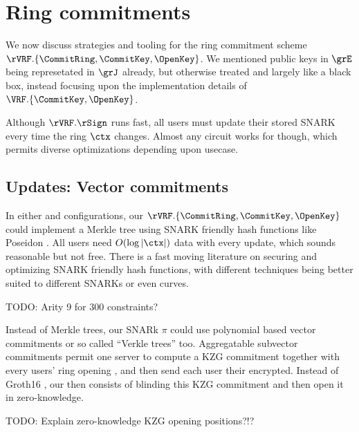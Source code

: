 \section{Ring commitments}

We now discuss strategies and tooling for the ring commitment scheme
$\rVRF.\{ \CommitRing, \CommitKey, \OpenKey \}$.
We mentioned public keys in $\grE$ being represetated in $\grJ$ already,
but otherwise treated \pifast and \pisafe largely like a black box,
instead focusing upon the implementation details of 
 $\VRF.\{ \CommitKey, \OpenKey \}$.


Although $\rVRF.\rSign$ runs fast, all users must update their stored
SNARK \pifast every time the ring $\ctx$ changes.
Almost any circuit works for \pifast though,
 which permits diverse optimizations depending upon usecase.

\subsection{Updates: Vector commitments}

In either \pifast and \pisafe configurations, 
our $\rVRF.\{ \CommitRing, \CommitKey, \OpenKey \}$ could implement a
Merkle tree using SNARK friendly hash functions like Poseidon \cite{poseidon}.
%
All users need $O(\log |\ctx|)$ data with every update, which sounds
reasonable but not free.  There is a fast moving literature on securing
and optimizing SNARK friendly hash functions, with different techniques
being better suited to different SNARKs or even curves.

TODO: Arity 9 for 300 constraints?   %

Instead of Merkle trees, our SNARk $\pi$ could use polynomial based
vector commitments \cite{KZG} or so called ``Verkle trees'' \cite{??Verkle??} too.
%
Aggregatable subvector commitments \cite{aSVC} permit one server to
compute a KZG commitment \comring together with every users' ring opening
\openring,  and then send each user their \openring encrypted.
Instead of Groth16 \cite{groth16}, our \pisafe then consists
of blinding this KZG commitment and then open it in zero-knowledge.

TODO: Explain zero-knowledge KZG opening positions?!?

